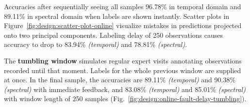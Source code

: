 
Accuracies after sequentially seeing all samples 96.78\% in temporal domain and 89.11\% in spectral domain when labels are shown instantly. Scatter plots in Figure~\ref{fig:design:scatter-plot-online} visualize mistakes in predictions projected onto two principal components. Labeling delay of 250 observations causes accuracy to drop to 83.94\% \emph{(temporal)} and 78.81\% \emph{(spectral)}.
	
	
	
The \textbf{tumbling window} simulates regular expert visits annotating observations recorded until that moment. Labels for the whole previous window are supplied at once. In the final sample, the accuracies are 89.11\% \emph{(temporal)} and 90.38\% \emph{(spectral)} with immediate feedback, and 83.08\% \emph{(temporal)} and 85.01\% \emph{(spectral)} with window length of 250 samples (Fig.~\ref{fig:design:online-fault-delay-tumbling}). 

